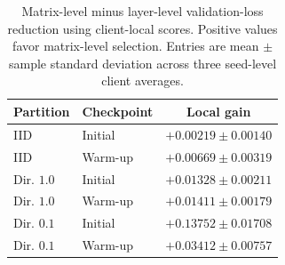 \begin{table}[t]
\centering
\caption{Matrix-level minus layer-level validation-loss reduction using client-local scores. Positive values favor matrix-level selection. Entries are mean $\pm$ sample standard deviation across three seed-level client averages.}
\label{tab:fm-p2-complete}
\small
\begin{tabular}{@{}llc@{}}
\toprule
Partition & Checkpoint & Local gain \\
\midrule
IID & Initial & $+0.00219\pm0.00140$ \\
IID & Warm-up & $+0.00669\pm0.00319$ \\
Dir. $1.0$ & Initial & $+0.01328\pm0.00211$ \\
Dir. $1.0$ & Warm-up & $+0.01411\pm0.00179$ \\
Dir. $0.1$ & Initial & $+0.13752\pm0.01708$ \\
Dir. $0.1$ & Warm-up & $+0.03412\pm0.00757$ \\
\bottomrule
\end{tabular}
\end{table}
